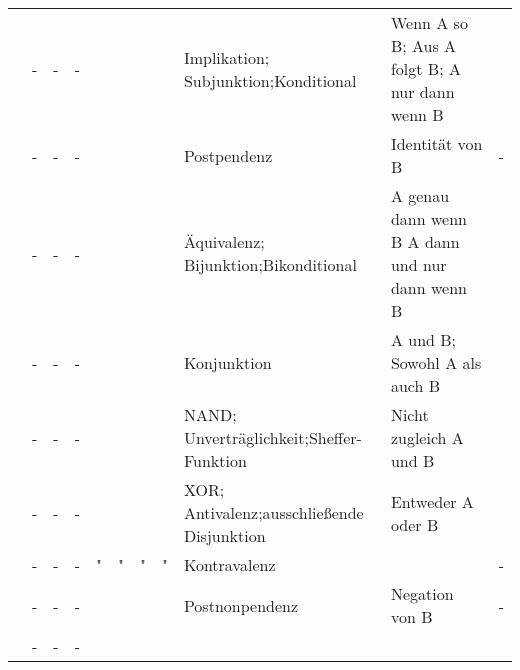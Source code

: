 \begin{table}
\begin{threeparttable}
\begin{tabularx}{\linewidth}{|c||c:cc:cccc|X:X|c|}
			& - & - & - &\texttrue&\textfalse&\texttrue&\texttrue
			& Implikation; Subjunktion;\newline Konditional
			& Wenn A so B; Aus A folgt B; A nur dann wenn B & \thepimp \\
			\tableline%
			\objqt{\lfloor}
			& - & - & - &\texttrue&\textfalse&\texttrue&\textfalse
			& Postpendenz & Identität von B & - \\
			\tableline%
			\objqt{\Sym{\lequiv}} \objqt{\Leftrightarrow}
			& - & - & - &\texttrue&\textfalse&\textfalse&\texttrue
			& Äquivalenz; Bijunktion;\newline Bikonditional
			& A genau dann wenn B \newline A dann und nur dann wenn B
			& \thepequiv \\
			\tableline%
			\objqt{\Sym{\land}} \objqt{\&} \objqt{\cdot}
			& - & - & - &\texttrue&\textfalse&\textfalse&\textfalse
			& Konjunktion & A und B; Sowohl A als auch B & \thepand \\
			\tablegroup%
			\rowcolor{cRareUse}
			\objqt{\Sym{\lnand}} \objqt{\barwedge} \objqt{\mid}
			& - & - & - &\textfalse&\texttrue&\texttrue&\texttrue
			& NAND; Unverträglichkeit;\newline Sheffer-Funktion
			& Nicht zugleich A und B & \thepnand \\
			\tableline%
			\objqt{\Sym{\lxor}} \objqt{\dot\lor} \objqt{\veebar} \objqt{\oplus}
			& - & - & - &\textfalse&\texttrue&\texttrue&\textfalse
			& XOR; Antivalenz;\newline ausschließende Disjunktion
			& Entweder A oder B & \thepxor \\
			\gapline%
			\objqt{\nleftrightarrow} \objqt{\nLeftrightarrow} \objqt{\nequiv}
			& - & - & - &"&"&"&"& Kontravalenz & & - \\
			\tableline%
			\objqt{\lceil}
			& - & - & - &\textfalse&\texttrue&\textfalse&\texttrue
			& Postnonpendenz & Negation von B & - \\
			\tableline%
			\objqt{\nrightarrow} \objqt{\nRightarrow} \objqt{\nsupset}
			& - & - & - &\textfalse&\texttrue&\textfalse&\textfalse

\end{tabularx}
\end{threeparttable}
\end{table}
